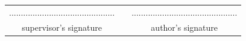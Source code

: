 \documentclass[a4paper,11pt,twoside]{report}
\theoremstyle{definition}
\begin{document}
\sloppy
{}


\null\thispagestyle{empty}\newpage


\thispagestyle{empty}\newpage
\null

\vfill

\begin{center}
\begin{tabular}[t]{ccc}
............................................. & \hspace*{100pt} & .............................................\\
supervisor's signature & \hspace*{100pt} & author's signature
\end{tabular}
\end{center}



\end{document}
